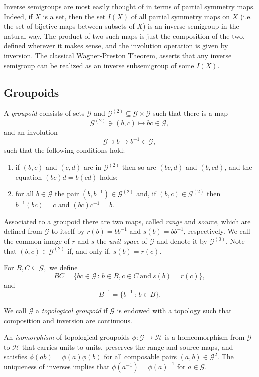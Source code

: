 \documentclass[11pt, a4paper]{amsart}
\newcommand{\G}{\ensuremath {\mathcal{G}}}
\newcommand{\Go}{\ensuremath {\mathcal{G}^{(0)}}}
\newcommand{\Gs}{\ensuremath {\mathcal{G}^{(2)}}}
\theoremstyle{plain}
\begin{document}
Inverse semigroups are most easily thought of in terms of partial symmetry maps. Indeed, if $X$ is a set, then the set $I(X)$ of all partial symmetry maps on $X$ (i.e. the set of bijetive maps between subsets of $X$) is an inverse semigroup in the natural way. The product of two such maps is just the composition of the two, defined wherever it makes sense, and the
involution operation is given by inversion. The classical Wagner-Preston Theorem, asserts that any inverse semigroup can be realized as an inverse subsemigroup of some $I(X).$



\subsection{Groupoids}
A \emph{groupoid} consists of sets $\G$ and $\Gs  \subseteq \G \times \G$ such that there is a map 
$$ \Gs \ni  (b, c) \mapsto bc \in  \G, $$
and an involution 
$$ \G \ni b \mapsto b^{-1} \in \G, $$
such that the following conditions hold:
\begin{enumerate}[{\rm (a)}]
\item if $(b, c)$ and $(c, d)$ are in $\Gs$ then so are  $(bc, d)$ and  $(b,cd)$, and the equation  $(bc)d = b(cd)$ holds; 
\item for all $b \in \G$ the pair $(b, b^{-1}) \in \Gs$ and, if $(b, c) \in \Gs$ then $b^{-1}(bc) = c$ and $(bc)c^{-1}=b.$
\end{enumerate}

Associated to a groupoid there are two maps, called \emph{range} and \emph{source}, which are defined from $\G$ to itself by $r(b) = bb^{-1}$ and $s(b) = bb^{-1}$, respectively. We call the common image of $r$ and $s$ the \emph{unit space} of $\G$ and denote it by $\Go$. Note that $(b,c) \in \Gs$ if, and only if, $s(b)=r(c).$

For $B, C \subseteq \G,$ we define
\begin{equation}\label{bisectionproduct}
 BC = \{bc \in \G \, : \,  b \in B, c \in C \ \mbox{and} \ s(b)=r(c) \},
\end{equation}
and
\begin{equation}\label{bisectioninverse}
B^{-1}= \{ b^{-1} \, : \, b \in B \}.
\end{equation}

We call $\G$ a \emph{topological groupoid} if $\G$ is endowed with a topology such that composition and inversion are continuous. 

An \emph{isomorphism} of topological groupoids $\phi:\G \to \mathcal{H}$ is a homeomorphism from $\G$ to $\mathcal{H}$ that carries units to units, preserves the range and source maps, and satisfies $\phi(ab) = \phi(a)\phi(b)$ for all composable pairs $(a,b) \in \G^2$. The uniqueness of inverses implies that $\phi(a^{-1})=\phi(a)^{-1}$ for $a \in \G$.
\end{document}
